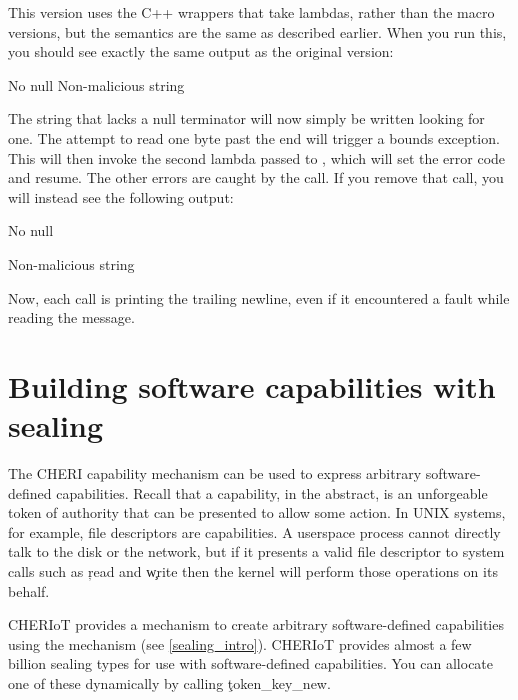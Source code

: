 \codelisting[marker=safe_uart,caption=Using structured error handling to ensure that a function does not crash.,label=lst:safeuartyolo, filename=examples/yolo_arguments/uart.cc]{}

This version uses the C++ wrappers that take lambdas, rather than the macro versions, but the semantics are the same as described earlier.
When you run this, you should see exactly the same output as the original version:

\begin{console}
No null
Non-malicious string
\end{console}

The string that lacks a null terminator will now simply be written looking for one.
The attempt to read one byte past the end will trigger a bounds exception.
This will then invoke the second lambda passed to , which will set the error code and resume.
The other errors are caught by the  call.
If you remove that call, you will instead see the following output:

\begin{console}
No null


Non-malicious string
\end{console}

Now, each call is printing the trailing newline, even if it encountered a fault while reading the message.

\section[label=software_capabilities]{Building software capabilities with sealing}

The CHERI capability mechanism can be used to express arbitrary software-defined capabilities.
Recall that a capability, in the abstract, is an unforgeable token of authority that can be presented to allow some action.
In UNIX systems, for example, file descriptors are capabilities.
A userspace process cannot directly talk to the disk or the network, but if it presents a valid file descriptor to system calls such as \c{read} and \c{write} then the kernel will perform those operations on its behalf.

CHERIoT provides a mechanism to create arbitrary software-defined capabilities using the  mechanism (see \ref{sealing_intro}).
CHERIoT provides almost a few billion sealing types for use with software-defined capabilities.
You can allocate one of these dynamically by calling \c{token_key_new}.

